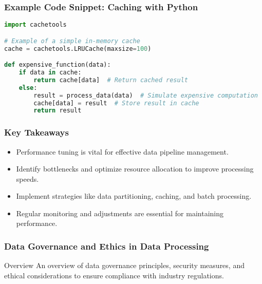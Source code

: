 \documentclass{beamer}
\begin{document}
\begin{frame}[fragile]
    \frametitle{Example Code Snippet: Caching with Python}
    \begin{lstlisting}[language=Python]
import cachetools

# Example of a simple in-memory cache
cache = cachetools.LRUCache(maxsize=100)

def expensive_function(data):
    if data in cache:
        return cache[data]  # Return cached result
    else:
        result = process_data(data)  # Simulate expensive computation
        cache[data] = result  # Store result in cache
        return result
    \end{lstlisting}
\end{frame}

\begin{frame}[fragile]
    \frametitle{Key Takeaways}
    \begin{itemize}
        \item Performance tuning is vital for effective data pipeline management.
        \item Identify bottlenecks and optimize resource allocation to improve processing speeds.
        \item Implement strategies like data partitioning, caching, and batch processing.
        \item Regular monitoring and adjustments are essential for maintaining performance.
    \end{itemize}
\end{frame}

\begin{frame}[fragile]
    \frametitle{Data Governance and Ethics in Data Processing}
    \begin{block}{Overview}
        An overview of data governance principles, security measures, and ethical considerations to ensure compliance with industry regulations.
    \end{block}
\end{frame}
\end{document}
